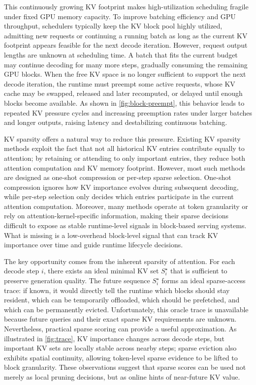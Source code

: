 \documentclass[sigplan,10pt,review,anonymous]{acmart}
\begin{document}
This continuously growing KV footprint makes high-utilization scheduling fragile under fixed GPU memory capacity.
To improve batching efficiency and GPU throughput, schedulers typically keep the KV block pool highly utilized, admitting new requests or continuing a running batch as long as the current KV footprint appears feasible for the next decode iteration.
However, request output lengths are unknown at scheduling time.
A batch that fits the current budget may continue decoding for many more steps, gradually consuming the remaining GPU blocks.
When the free KV space is no longer sufficient to support the next decode iteration, the runtime must preempt some active requests, whose KV cache may be swapped, released and later recomputed, or delayed until enough blocks become available.
As shown in \autoref{fig:block-preempt}, this behavior leads to repeated KV pressure cycles and increasing preemption rates under larger batches and longer outputs, raising latency and destabilizing continuous batching.

KV sparsity offers a natural way to reduce this pressure.
Existing KV sparsity methods exploit the fact that not all historical KV entries contribute equally to attention; by retaining or attending to only important entries, they reduce both attention computation and KV memory footprint.
However, most such methods are designed as one-shot compression or per-step sparse selection.
One-shot compression ignores how KV importance evolves during subsequent decoding, while per-step selection only decides which entries participate in the current attention computation.
Moreover, many methods operate at token granularity or rely on attention-kernel-specific information, making their sparse decisions difficult to expose as stable runtime-level signals in block-based serving systems.
What is missing is a low-overhead block-level signal that can track KV importance over time and guide runtime lifecycle decisions.

The key opportunity comes from the inherent sparsity of attention.
For each decode step $i$, there exists an ideal minimal KV set $S_i^\star$ that is sufficient to preserve generation quality.
The future sequence ${S_i^\star}$ forms an ideal sparse-access trace: if known, it would directly tell the runtime which blocks should stay resident, which can be temporarily offloaded, which should be prefetched, and which can be permanently evicted.
Unfortunately, this oracle trace is unavailable because future queries and their exact sparse KV requirements are unknown.
Nevertheless, practical sparse scoring can provide a useful approximation.
As illustrated in \autoref{fig:trace}, KV importance changes across decode steps, but important KV sets are locally stable across nearby steps; sparse eviction also exhibits spatial continuity, allowing token-level sparse evidence to be lifted to block granularity.
These observations suggest that sparse scores can be used not merely as local pruning decisions, but as online hints of near-future KV value.
\end{document}
